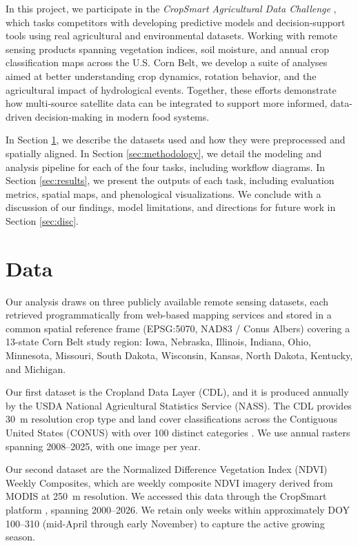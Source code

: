 \documentclass{article}
\begin{document}
In this project, we participate in the \textit{CropSmart Agricultural Data Challenge} \cite{challenge_video}, which tasks competitors with developing predictive models and decision-support tools using real agricultural and environmental datasets. Working with remote sensing products spanning vegetation indices, soil moisture, and annual crop classification maps across the U.S. Corn Belt\cite{corn_belt}, we develop a suite of analyses aimed at better understanding crop dynamics, rotation behavior, and the agricultural impact of hydrological events. Together, these efforts demonstrate how multi-source satellite data can be integrated to support more informed, data-driven decision-making in modern food systems.

In Section \ref{sec:data}, we describe the datasets used and how they were preprocessed and spatially aligned. In Section \ref{sec:methodology}, we detail the modeling and analysis pipeline for each of the four tasks, including workflow diagrams. In Section \ref{sec:results}, we present the outputs of each task, including evaluation metrics, spatial maps, and phenological visualizations. We conclude with a discussion of our findings, model limitations, and directions for future work in Section \ref{sec:disc}.

\section{Data}
\label{sec:data}
Our analysis draws on three publicly available remote sensing datasets, each retrieved programmatically from web-based mapping services and stored in a common spatial reference frame (EPSG:5070, NAD83 / Conus Albers) \cite{espg_ref} covering a 13-state Corn Belt study region: Iowa, Nebraska, Illinois, Indiana, Ohio, Minnesota, Missouri, South Dakota, Wisconsin, Kansas, North Dakota, Kentucky, and Michigan.

Our first dataset is the Cropland Data Layer (CDL), and it is produced annually by the USDA National Agricultural Statistics Service (NASS). The CDL provides 30~m resolution crop type and land cover classifications across the Contiguous United States (CONUS) with over 100 distinct categories \cite{cdl_cropscape, cdl_scinet}. We use annual rasters spanning 2008--2025, with one image per year.

Our second dataset are the Normalized Difference Vegetation Index (NDVI) Weekly Composites, which are weekly composite NDVI imagery derived from MODIS at 250~m resolution. We accessed this data through the CropSmart platform \cite{ndvi_cropsmart}, spanning 2000--2026. We retain only weeks within approximately DOY 100--310 (mid-April through early November) to capture the active growing season.
\end{document}
